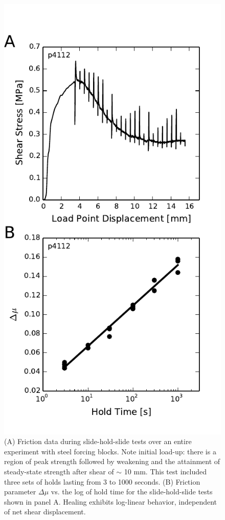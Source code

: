 \begin{figure}
\begin{centering}
\includegraphics{chap_granular_stiffness/Fig6.pdf}
\caption{\label{fig:healing_p4112}
(A) Friction data during slide-hold-slide tests over an entire experiment with steel forcing blocks. Note initial load-up: there is a region of peak strength followed by weakening and the attainment of steady-state strength after shear of $\sim$ 10 mm.  This test included three sets of holds lasting from 3 to 1000 seconds. (B) Friction parameter $\Delta \mu$ vs. the log of hold time for the slide-hold-slide tests shown in panel A.  Healing exhibits log-linear behavior, independent of net shear displacement. }
\end{centering}
\end{figure}

